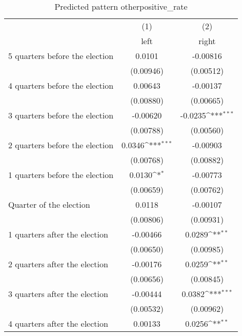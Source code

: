 \begin{table}[htbp]\centering
\def\sym#1{\ifmmode^{#1}\else\(^{#1}\)\fi}
\caption{Predicted pattern otherpositive\_rate}
\begin{tabular}{l*{2}{c}}
\hline\hline
                    &\multicolumn{1}{c}{(1)}&\multicolumn{1}{c}{(2)}\\
                    &\multicolumn{1}{c}{left}&\multicolumn{1}{c}{right}\\
\hline
 5 quarters before the election&      0.0101         &    -0.00816         \\
                    &   (0.00946)         &   (0.00512)         \\
[1em]
 4 quarters before the election&     0.00643         &    -0.00137         \\
                    &   (0.00880)         &   (0.00665)         \\
[1em]
 3 quarters before the election&    -0.00620         &     -0.0235\sym{***}\\
                    &   (0.00788)         &   (0.00560)         \\
[1em]
 2 quarters before the election&      0.0346\sym{***}&    -0.00903         \\
                    &   (0.00768)         &   (0.00882)         \\
[1em]
 1 quarters before the election&      0.0130\sym{*}  &    -0.00773         \\
                    &   (0.00659)         &   (0.00762)         \\
[1em]
Quarter of the election&      0.0118         &    -0.00107         \\
                    &   (0.00806)         &   (0.00931)         \\
[1em]
 1 quarters after the election&    -0.00466         &      0.0289\sym{**} \\
                    &   (0.00650)         &   (0.00985)         \\
[1em]
 2 quarters after the election&    -0.00176         &      0.0259\sym{**} \\
                    &   (0.00656)         &   (0.00845)         \\
[1em]
 3 quarters after the election&    -0.00444         &      0.0382\sym{***}\\
                    &   (0.00532)         &   (0.00962)         \\
[1em]
 4 quarters after the election&     0.00133         &      0.0256\sym{**} \\

\end{tabular}
\end{table}
